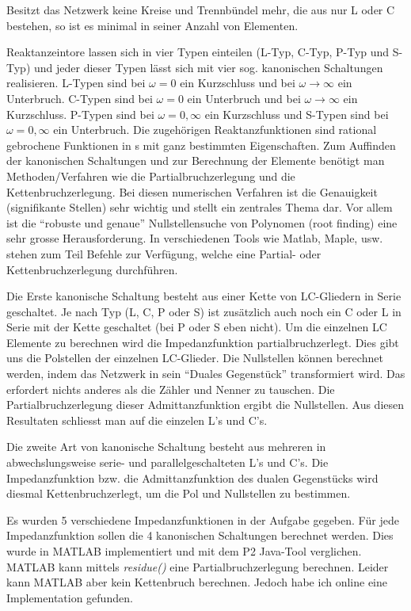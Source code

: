 \documentclass[notitlepage]{fhnwreport/fhnwreport}
\begin{document}
Besitzt das Netzwerk keine Kreise und Trennb\"undel mehr, die aus nur L oder C
bestehen, so ist es minimal in seiner Anzahl von Elementen.

Reaktanzeintore lassen sich in vier Typen einteilen (L-Typ,  C-Typ,  P-Typ und
S-Typ)  und  jeder  dieser  Typen  l\"asst  sich  mit  vier  sog.  kanonischen
Schaltungen  realisieren.  L-Typen sind bei $\omega=0$ ein Kurzschluss und bei
$\omega\to\infty$ ein Unterbruch.  C-Typen  sind bei $\omega=0$ ein Unterbruch
und    bei    $\omega\to\infty$    ein    Kurzschluss.    P-Typen   sind   bei
$\omega=0,\infty$  ein  Kurzschluss  und  S-Typen  sind  bei $\omega=0,\infty$
ein Unterbruch. Die zugeh\"origen Reaktanzfunktionen sind rational  gebrochene
Funktionen  in  s   mit  ganz  bestimmten  Eigenschaften.  Zum  Auffinden  der
kanonischen  Schaltungen  und  zur  Berechnung  der  Elemente  ben\"otigt  man
Methoden/Verfahren wie die Partialbruchzerlegung und die Kettenbruchzerlegung.
Bei  diesen  numerischen Verfahren ist die Genauigkeit (signifikante  Stellen)
sehr wichtig und  stellt  ein zentrales Thema dar. Vor allem ist die ``robuste
und genaue'' Nullstellensuche von Polynomen (root  finding)  eine  sehr grosse
Herausforderung. In verschiedenen Tools wie Matlab,  Maple,  usw.  stehen  zum
Teil Befehle zur Verf\"ugung, welche  eine  Partial- oder Kettenbruchzerlegung
durchf\"uhren.

Die Erste kanonische Schaltung  besteht  aus  einer  Kette  von LC-Gliedern in
Serie geschaltet. Je nach  Typ (L, C, P oder S) ist zus\"atzlich auch noch ein
C oder L in Serie mit der Kette geschaltet  (bei  P oder S eben nicht). Um die
einzelnen   LC    Elemente    zu    berechnen    wird   die   Impedanzfunktion
partialbruchzerlegt. Dies gibt uns die  Polstellen  der  einzelnen LC-Glieder.
Die Nullstellen k\"onnen berechnet werden, indem das Netzwerk in sein ``Duales
Gegenst\"uck''  transformiert wird.  Das  erfordert  nichts  anderes  als  die
Z\"ahler   und   Nenner   zu   tauschen.   Die   Partialbruchzerlegung  dieser
Admittanzfunktion ergibt die Nullstellen. Aus diesen Resultaten  schliesst man
auf die einzelen L's und C's.

Die  zweite  Art   von   kanonische   Schaltung   besteht   aus   mehreren  in
abwechslungsweise   serie-   und   parallelgeschalteten   L's  und  C's.   Die
Impedanzfunktion  bzw.  die Admittanzfunktion des  dualen  Gegenst\"ucks  wird
diesmal   Kettenbruchzerlegt,  um  die  Pol  und  Nullstellen  zu   bestimmen.

Es wurden 5 verschiedene Impedanzfunktionen in der Aufgabe gegeben. F\"ur jede
Impedanzfunktion sollen die  4  kanonischen Schaltungen berechnet werden. Dies
wurde in MATLAB implementiert und mit dem P2 Java-Tool verglichen. MATLAB kann
mittels \textit{residue()} eine Partialbruchzerlegung  berechnen.  Leider kann
MATLAB  aber  kein  Kettenbruch   berechnen.   Jedoch  habe  ich  online  eine
Implementation gefunden.
\end{document}
